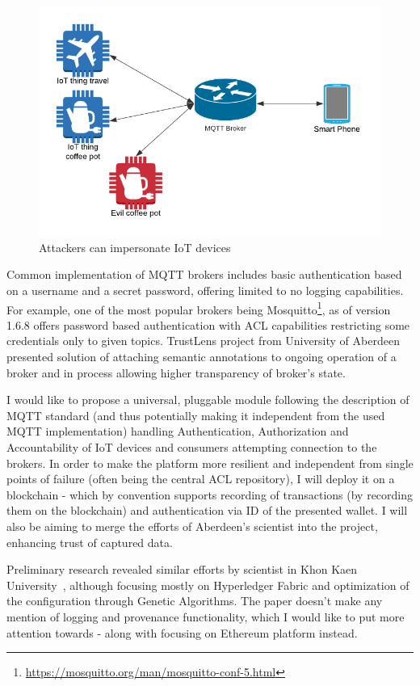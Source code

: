 \documentclass[a4paper,12pt]{article}
\begin{document}
\begin{figure}[ht]
  \centering
  \caption{Attackers can impersonate IoT devices}\label{fig:iot1}
  \includegraphics[scale=0.8]{iot_attack}
\end{figure}

Common implementation of MQTT brokers includes basic authentication based on a username and a secret password, offering limited to no logging capabilities. For example, one of the most popular brokers being Mosquitto\footnote{\url{https://mosquitto.org/man/mosquitto-conf-5.html}}, as of version 1.6.8 offers password based authentication with ACL capabilities restricting some credentials only to given topics. TrustLens project from University of Aberdeen presented solution of attaching semantic annotations to ongoing operation of a broker and in process allowing higher transparency of broker's state\cite{10.1145/3366610.3368099}.

I would like to propose a universal, pluggable module following the description of MQTT standard (and thus potentially making it independent from the used MQTT implementation) handling Authentication, Authorization and Accountability of IoT devices and consumers attempting connection to the brokers. In order to make the platform more resilient and independent from single points of failure (often being the central ACL repository), I will deploy it on a blockchain - which by convention supports recording of transactions (by recording them on the blockchain) and authentication via ID of the presented wallet. I will also be aiming to merge the efforts of Aberdeen's scientist into the project, enhancing trust of captured data.

Preliminary research revealed similar efforts by scientist in Khon Kaen University~\cite{8523942}, although focusing mostly on Hyperledger Fabric and optimization of the configuration through Genetic Algorithms. The paper doesn't make any mention of logging and provenance functionality, which I would like to put more attention towards - along with focusing on Ethereum platform instead.
\end{document}
